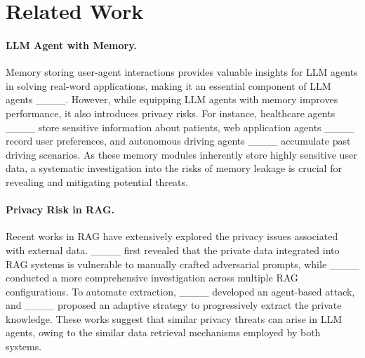 \section{Related Work}
\paragraph{LLM Agent with Memory.}
Memory storing user-agent interactions provides valuable insights for LLM agents in solving real-word applications, making it an essential component of LLM agents ____. 
However, while equipping LLM agents with memory improves performance, it also introduces privacy risks. 
For instance, healthcare agents ____ store sensitive information about patients, web application agents ____ record user preferences, and autonomous driving agents ____ accumulate past driving scenarios. 
As these memory modules inherently store highly sensitive user data, a systematic investigation into the risks of memory leakage is crucial for revealing and mitigating potential threats. 



\vspace{-6pt}
\paragraph{Privacy Risk in RAG.}
Recent works in RAG have extensively explored the privacy issues associated with external data. 
____ first revealed that the private data integrated into RAG systems is vulnerable to manually crafted adversarial prompts, while ____ conducted a more comprehensive investigation across multiple RAG configurations. 
To automate extraction, ____ developed an agent-based attack, and ____ proposed an adaptive strategy to progressively extract the private knowledge. 
These works suggest that similar privacy threats can arise in LLM agents, owing to the similar data retrieval mechanisms employed by both systems.
